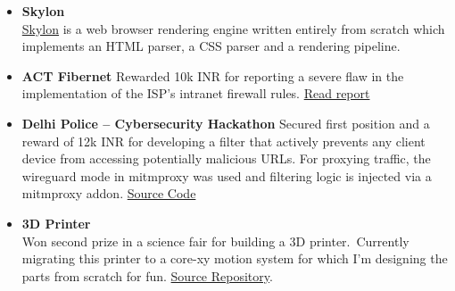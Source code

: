 \documentclass[11pt]{article}
\begin{document}
\begin{tblr}
\begin{itemize}[topsep=0pt,leftmargin=15pt]

            \item \textbf{Skylon}\\
            \href{https://github.com/sujaldev/skylon}{\color{blue}Skylon} is a web browser rendering engine
            written entirely from scratch which implements an HTML parser, a CSS parser and a rendering pipeline.


            \item \textbf{ACT Fibernet}\newline
            Rewarded 10k INR for reporting a severe flaw in the implementation of the ISP's intranet firewall rules.
            \href{https://pdf.sujal.dev/act/report.pdf}{\color{blue} Read report}


            \item \textbf{Delhi Police -- Cybersecurity Hackathon}\newline
            Secured first position and a reward of 12k INR for developing a filter that actively prevents any client
            device from accessing potentially malicious URLs. For proxying traffic, the wireguard mode in mitmproxy
            was used and filtering logic is injected via a mitmproxy addon.
            \href{https://github.com/sujaldev/cerberus}{\color{blue}Source Code}


            \item \textbf{3D Printer}\\
            Won second prize in a science fair for building a 3D printer.\ Currently migrating this printer to a core-xy
            motion system for which I'm designing the parts from scratch for fun.
            \href{https://github.com/xserv-labs/cad}{\color{blue}Source Repository}.



\end{itemize}
\end{tblr}
\end{document}
